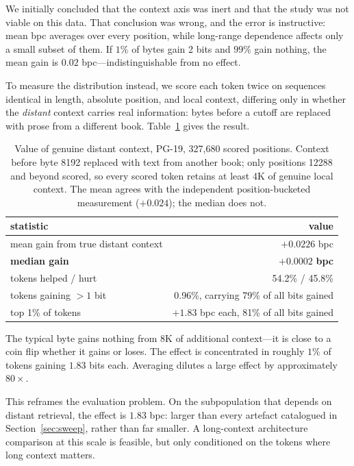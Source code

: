 \documentclass[11pt]{article}
\begin{document}
We initially concluded that the context axis was inert and that the study was
not viable on this data. That conclusion was wrong, and the error is
instructive: mean bpc averages over every position, while long-range dependence
affects only a small subset of them. If $1\%$ of bytes gain 2 bits and $99\%$
gain nothing, the mean gain is $0.02$ bpc---indistinguishable from no effect.

To measure the distribution instead, we score each token twice on sequences
identical in length, absolute position, and local context, differing only in
whether the \emph{distant} context carries real information: bytes before a
cutoff are replaced with prose from a different book. Table~\ref{tab:dilution}
gives the result.

\begin{table}[t]
\centering
\small
\begin{tabular}{lr}
\toprule
statistic & value \\
\midrule
mean gain from true distant context & $+0.0226$ bpc \\
\textbf{median gain} & $\mathbf{+0.0002}$ \textbf{bpc} \\
tokens helped / hurt & 54.2\% / 45.8\% \\
tokens gaining $>1$ bit & 0.96\%, carrying 79\% of all bits gained \\
top 1\% of tokens & $+1.83$ bpc each, 81\% of all bits gained \\
\bottomrule
\end{tabular}
\caption{Value of genuine distant context, PG-19, 327{,}680 scored positions.
Context before byte 8192 replaced with text from another book; only positions
12288 and beyond scored, so every scored token retains at least 4K of genuine
local context. The mean agrees with the independent position-bucketed
measurement ($+0.024$); the median does not.}
\label{tab:dilution}
\end{table}

The typical byte gains nothing from 8K of additional context---it is close to a
coin flip whether it gains or loses. The effect is concentrated in roughly $1\%$
of tokens gaining $1.83$ bits each. Averaging dilutes a large effect by
approximately $80\times$.

This reframes the evaluation problem. On the subpopulation that depends on
distant retrieval, the effect is $1.83$ bpc: larger than every artefact
catalogued in Section~\ref{sec:sweep}, rather than far smaller. A long-context
architecture comparison at this scale is feasible, but only conditioned on the
tokens where long context matters.
\end{document}
